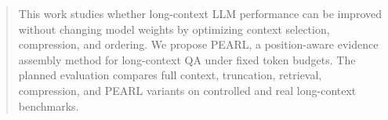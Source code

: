 \begin{abstract}
This work studies whether long-context LLM performance can be improved without
changing model weights by optimizing context selection, compression, and
ordering. We propose PEARL, a position-aware evidence assembly method for
long-context QA under fixed token budgets. The planned evaluation compares full
context, truncation, retrieval, compression, and PEARL variants on controlled
and real long-context benchmarks.
\end{abstract}
